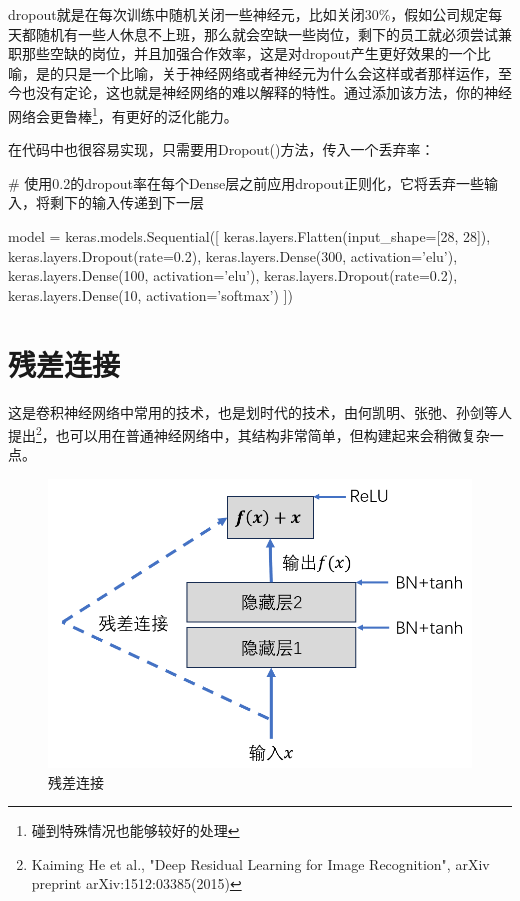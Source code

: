 \documentclass[a5paper, 11pt, openany]{book}
\begin{document}
dropout就是在每次训练中随机关闭一些神经元，比如关闭30\%，假如公司规定每天都随机有一些人休息不上班，那么就会空缺一些岗位，剩下的员工就必须尝试兼职那些空缺的岗位，并且加强合作效率，这是对dropout产生更好效果的一个比喻，是的只是一个比喻，关于神经网络或者神经元为什么会这样或者那样运作，至今也没有定论，这也就是神经网络的难以解释的特性。通过添加该方法，你的神经网络会更鲁棒\footnote{碰到特殊情况也能够较好的处理}，有更好的泛化能力。

在代码中也很容易实现，只需要用Dropout()方法，传入一个丢弃率：

\begin{python}
# 使用0.2的dropout率在每个Dense层之前应用dropout正则化，它将丢弃一些输入，将剩下的输入传递到下一层

model = keras.models.Sequential([
    keras.layers.Flatten(input_shape=[28, 28]),
    keras.layers.Dropout(rate=0.2),
    keras.layers.Dense(300, activation='elu'), 
    keras.layers.Dense(100, activation='elu'),
    keras.layers.Dropout(rate=0.2),
    keras.layers.Dense(10, activation='softmax')
])
\end{python}

\newpage

\section{残差连接}\label{残差连接}

这是卷积神经网络中常用的技术，也是划时代的技术，由何凯明、张弛、孙剑等人提出\footnote{Kaiming He et al., "Deep Residual Learning for Image Recognition", arXiv preprint arXiv:1512:03385(2015)}，也可以用在普通神经网络中，其结构非常简单，但构建起来会稍微复杂一点。

\begin{figure}[h!]\label{残差连接图像}
    \centering
    \includegraphics[width=\textwidth]{figures/残差单元.png}
    \caption{残差连接}
\end{figure}
\end{document}
